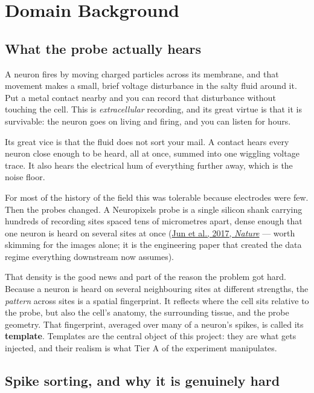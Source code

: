 \documentclass[12pt]{article}
\begin{document}
\section{Domain Background}

\subsection{What the probe actually hears}

A neuron fires by moving charged particles across its membrane, and that movement makes a
small, brief voltage disturbance in the salty fluid around it. Put a metal contact nearby
and you can record that disturbance without touching the cell. This is \emph{extracellular}
recording, and its great virtue is that it is survivable: the neuron goes on living and
firing, and you can listen for hours.

Its great vice is that the fluid does not sort your mail. A contact hears every neuron
close enough to be heard, all at once, summed into one wiggling voltage trace. It also
hears the electrical hum of everything further away, which is the noise floor.

For most of the history of the field this was tolerable because electrodes were few. Then
the probes changed. A Neuropixels probe is a single silicon shank carrying hundreds of
recording sites spaced tens of micrometres apart, dense enough that one neuron is heard on
several sites at once
(\href{https://doi.org/10.1038/nature24636}{Jun et al., 2017, \emph{Nature}} --- worth
skimming for the images alone; it is the engineering paper that created the data regime
everything downstream now assumes).

That density is the good news and part of the reason the problem got hard. Because a neuron
is heard on several neighbouring sites at different strengths, the \emph{pattern} across sites
is a spatial fingerprint. It reflects where the cell sits relative to the probe, but also the
cell's anatomy, the surrounding tissue, and the probe geometry. That fingerprint, averaged
over many of a neuron's spikes, is called its \textbf{template}. Templates are the central
object of this project: they are what gets injected, and their realism is what Tier A of the
experiment manipulates.

\subsection{Spike sorting, and why it is genuinely hard}
\end{document}
